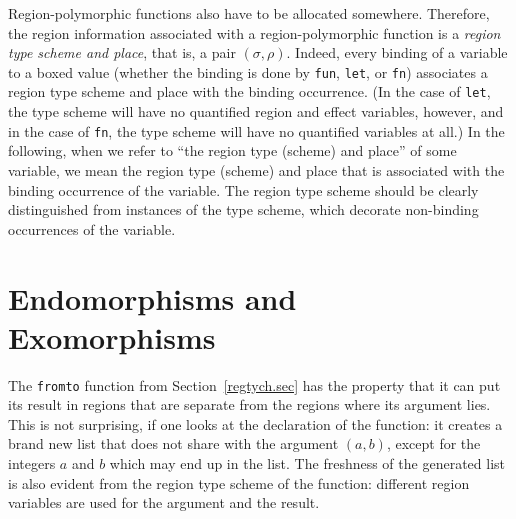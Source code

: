 \documentclass[12pt]{book}
\begin{document}
Region-polymorphic functions also have to be allocated somewhere.
Therefore, the region information associated with a region-polymorphic
function is a {\em region type scheme and place}, that is, a pair
$(\sigma,\rho)$.  Indeed, every binding of a variable to a boxed value
(whether the binding is done by {\tt fun}, {\tt let}, or {\tt fn})
associates a region type scheme and place with the binding occurrence.
(In the case of {\tt let}, the type scheme will have no quantified
region and effect variables, however, and in the case of {\tt fn}, the
type scheme will have no quantified variables at all.) In the
following, when we refer to ``the region type (scheme) and place'' of
some variable, we mean the region type (scheme) and place that is
associated with the binding occurrence of the variable. The region
type scheme should be clearly distinguished from instances of the type
scheme, which decorate non-binding occurrences of the variable.

\section{Endomorphisms and Exomorphisms}
The {\tt fromto} function from Section~\ref{regtych.sec} has the property that
it can put its result in regions that are separate from the regions where its
argument lies. This is not surprising, if one looks at the declaration of the
function: it creates a brand new list that does not share with the argument
$(a,b)$, except for the integers $a$ and $b$ which may end up in the list.
The freshness of the generated list is also evident from the region type scheme
of the function: different region variables are used for the argument and the result.
\end{document}
